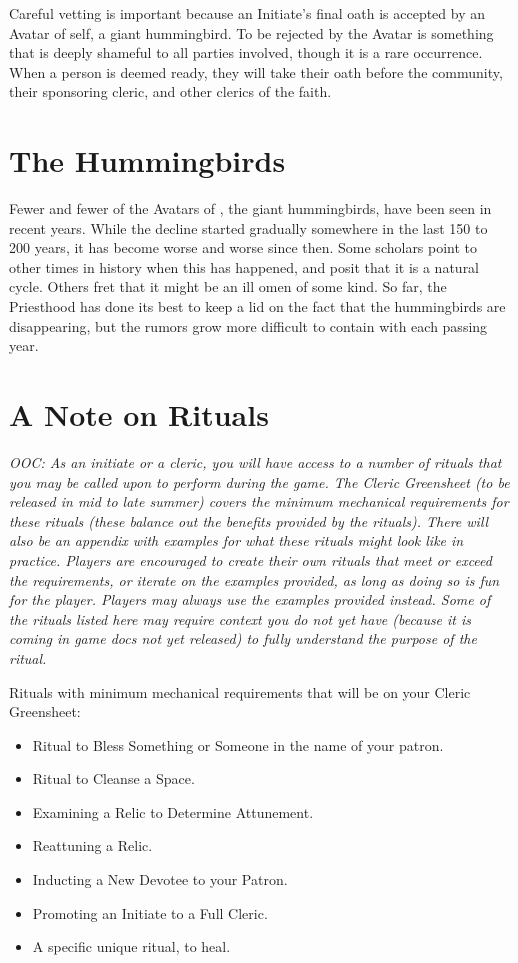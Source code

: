 \documentclass[blue]{GL2020}
\begin{document}
Careful vetting is important because an Initiate’s final oath is accepted by an Avatar of \cFarmGod{} \cFarmGod{\them}self, a giant hummingbird. To be rejected by the Avatar is something that is deeply shameful to all parties involved, though it is a rare occurrence. When a person is deemed ready, they will take their oath before the community, their sponsoring cleric, and other clerics of the faith.

\section*{The Hummingbirds}
Fewer and fewer of the Avatars of \cFarmGod{}, the giant hummingbirds, have been seen in recent years.  While the decline started gradually somewhere in the last 150 to 200 years, it has become worse and worse since then. Some scholars point to other times in history when this has happened, and posit that it is a natural cycle. Others fret that it might be an ill omen of some kind. So far, the Priesthood has done its best to keep a lid on the fact that the hummingbirds are disappearing, but the rumors grow more difficult to contain with each passing year.

\section*{A Note on Rituals}

\emph{OOC: As an initiate or a cleric, you will have access to a number of rituals that you may be called upon to perform during the game. The Cleric Greensheet (to be released in mid to late summer) covers the minimum mechanical requirements for these rituals (these balance out the benefits provided by the rituals). There will also be an appendix with examples for what these rituals might look like in practice. Players are encouraged to create their own rituals that meet or exceed the requirements, or iterate on the examples provided, as long as doing so is fun for the player. Players may always use the examples provided instead. Some of the rituals listed here may require context you do not yet have (because it is coming in game docs not yet released) to fully understand the purpose of the ritual.}

Rituals with minimum mechanical requirements that will be on your Cleric Greensheet:
\begin{itemize}
  \item Ritual to Bless Something or Someone in the name of your patron.
  \item Ritual to Cleanse a Space.
  \item Examining a Relic to Determine Attunement.
  \item Reattuning a Relic.
  \item Inducting a New Devotee to your Patron.
  \item Promoting an Initiate to a Full Cleric.
  \item A \pFarm{} specific unique ritual, to heal.
\end{itemize}
\end{document}
